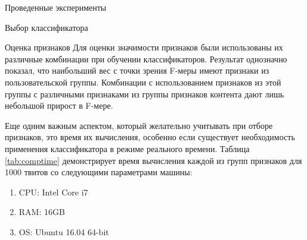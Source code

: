 \begin{section}{Проведенные эксперименты}
\begin{subsection}{Выбор классификатора}
\begin{table}[H]
\centering
{}
\caption{Сравнение показателей классификаторов}
\label{tab:results}
\end{table}



\end{subsection}


\begin{subsection}{Оценка признаков}
Для оценки значимости признаков были использованы их различные комбинации  при обучении классификаторов. Результат однозначно показал, что наибольший вес с точки зрения F-меры имеют признаки из пользовательской группы. Комбинации с использованием признаков из этой группы с различными признаками из группы признаков контента дают лишь небольшой прирост в F-мере.

Еще одним важным аспектом, который желательно учитывать при отборе признаков, это время их вычисления, особенно если существует необходимость применения классификатора в режиме реального времени. Таблица \ref{tab:comptime} демонстрирует время вычисления каждой из групп признаков для 1000 твитов со следующими параметрами машины:
\begin{enumerate}
\item CPU: Intel Core i7
\item RAM: 16GB
\item OS: Ubuntu 16.04 64-bit
\end{enumerate}



\begin{table}[H]
\centering
{}


\end{table}
\end{subsection}
\end{section}
